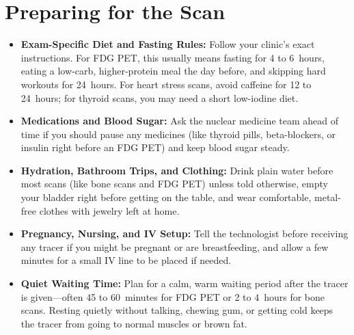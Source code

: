 \section{Preparing for the Scan}
\begin{itemize}
  \item \textbf{Exam-Specific Diet and Fasting Rules:} Follow your clinic's exact instructions. For FDG PET, this usually means fasting for 4 to 6~hours, eating a low-carb, higher-protein meal the day before, and skipping hard workouts for 24~hours. For heart stress scans, avoid caffeine for 12 to 24~hours; for thyroid scans, you may need a short low-iodine diet.
  \item \textbf{Medications and Blood Sugar:} Ask the nuclear medicine team ahead of time if you should pause any medicines (like thyroid pills, beta-blockers, or insulin right before an FDG PET) and keep blood sugar steady.
  \item \textbf{Hydration, Bathroom Trips, and Clothing:} Drink plain water before most scans (like bone scans and FDG PET) unless told otherwise, empty your bladder right before getting on the table, and wear comfortable, metal-free clothes with jewelry left at home.
  \item \textbf{Pregnancy, Nursing, and IV Setup:} Tell the technologist before receiving any tracer if you might be pregnant or are breastfeeding, and allow a few minutes for a small IV line to be placed if needed.
  \item \textbf{Quiet Waiting Time:} Plan for a calm, warm waiting period after the tracer is given---often 45 to 60~minutes for FDG PET or 2 to 4~hours for bone scans. Resting quietly without talking, chewing gum, or getting cold keeps the tracer from going to normal muscles or brown fat.
\end{itemize}

